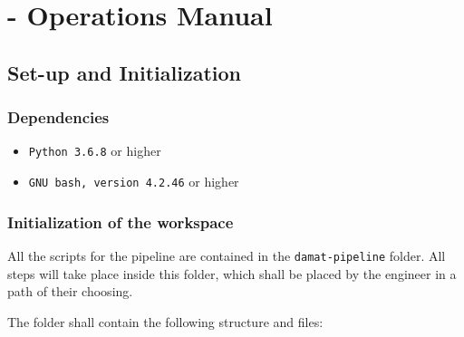 
\chapter{\DAMA - Operations Manual}

\section{Set-up and Initialization}
\label{sec:dama_setup}
\subsection{Dependencies}

\begin{itemize}
	\item \texttt{Python 3.6.8} or higher
	\item \texttt{GNU bash, version 4.2.46} or higher
\end{itemize}

\subsection{Initialization of the \DAMA workspace}

All the scripts for the \DAMA pipeline are contained in the \texttt{damat-pipeline} folder.
All \DAMA steps will take place inside this folder, which shall be placed by the engineer in a path of their choosing.

The folder shall contain the following structure and files:

